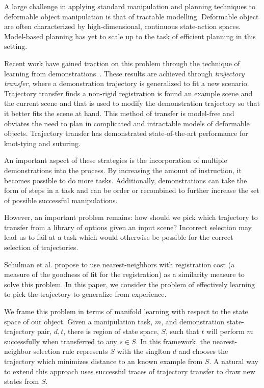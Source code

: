 A large challenge in applying standard manipulation and planning techniques to
deformable object manipulation is that of tractable modelling. Deformable object 
are often characterized by high-dimensional, continuous state-action spaces. Model-based 
planning has yet to scale up to the task of efficient planning in this
setting.

Recent work have gained traction on this problem through the technique of 
learning from demonstrations~\cite{Schulmanetal_ISRR2013,Schulmanetal_IROS2013}.
These results are achieved through \emph{trajectory transfer}, where a demonstration
trajectory is generalized to fit a new scenario. Trajectory transfer finds a non-rigid
registration is found an example scene and the current scene and that is
used to modify the demonstration trajectory so that it better fits the scene at hand.
This method of transfer is model-free and obviates the need to plan in complicated
and intractable models of deformable objects. Trajectory transfer has demonstrated 
state-of-the-art performance for knot-tying and suturing.

An important aspect of these strategies is the incorporation of multiple demonstrations
into the process. By increasing the amount of instruction, it becomes possible to do more
tasks. Additionally, demonstrations can take the form of steps in a task and can be
order or recombined to further increase the set of possible successful manipulations.

However, an important problem remains: how should we pick which trajectory to transfer
from a library of options given an input scene? Incorrect selection may lead us
to fail at a task which would otherwise be possible for the correct selection of 
trajectories.

Schulman et al. propose to use nearest-neighbors with registration cost (a measure of the goodness of 
fit for the registration) as a similarity measure to solve this problem. In this paper,
we consider the problem of effectively learning to pick the trajectory to generalize
from experience.

We frame this problem in terms of manifold learning with respect to the state space of our object.
Given a manipulation task, $m$, and demonstration state-trajectory pair, $d, t$, there is region of state space, $S$, 
such that $t$ will perform $m$ successfully when transferred to any $s \in S$. 
In this framework, the nearest-neighbor selection rule represents $S$ with the singlton $d$ and chooses the 
trajectory which minimizes distance to an known example from $S$.  A natural way to extend this approach uses successful traces of trajectory transfer
to draw new states from $S$.

